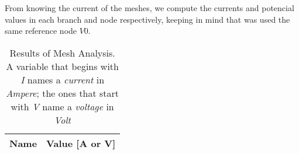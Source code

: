 From knowing the current of the meshes, we compute the currents and  potencial values in each branch and node respectively, keeping in mind that was used the same reference node $V0$.


\begin{table}[h]
  \centering
  \begin{tabular}{|l|r|}
    \hline
    {\bf Name} & {\bf Value [A or V]} \\ \hline
    
  \end{tabular}
  \caption{Results of Mesh Analysis. A variable that begins  with \textit{I} names a \textit{current} in \textit{Ampere}; the ones that start with \textit{V} name a \textit{voltage} in \textit{Volt}}
  \label{tab:op_mesh_tab}
\end{table}




